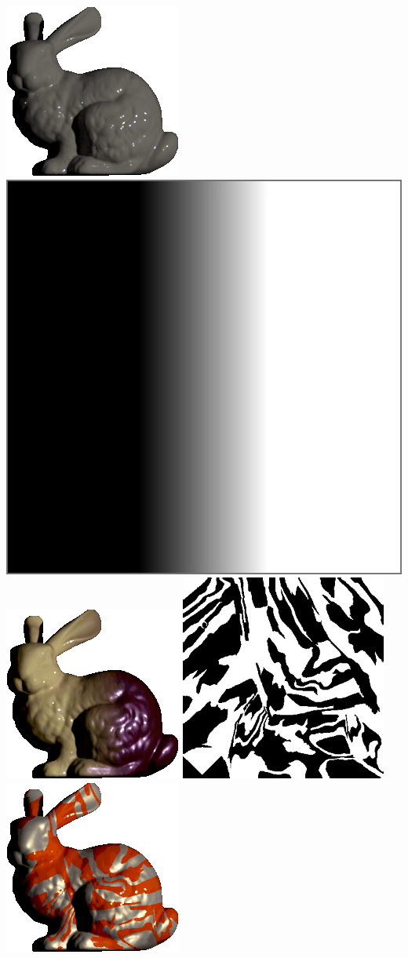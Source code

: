 \centering
\begin{minipage}{0.7\textwidth} \centering
    \includegraphics[height=0.170\textwidth]{ch-gcnet/images/Datasets/Synthetic/bunny_uniform__gm} %
    \includegraphics[height=0.170\textwidth]{ch-gcnet/images/Results/Synthetic/ramp_border.jpg} %
    \includegraphics[height=0.170\textwidth]{ch-gcnet/images/Datasets/Synthetic/bunny_ramp__gm} %
    \includegraphics[height=0.170\textwidth]{ch-gcnet/images/Results/Synthetic/irregular.png} %
    \includegraphics[height=0.170\textwidth]{ch-gcnet/images/Datasets/Synthetic/bunny_irregular2__gm} 
    \vspace{-0.5em}
    \\
    \\
\end{minipage}
\begin{minipage}{0.7\textwidth} \centering
{}
\end{minipage}
